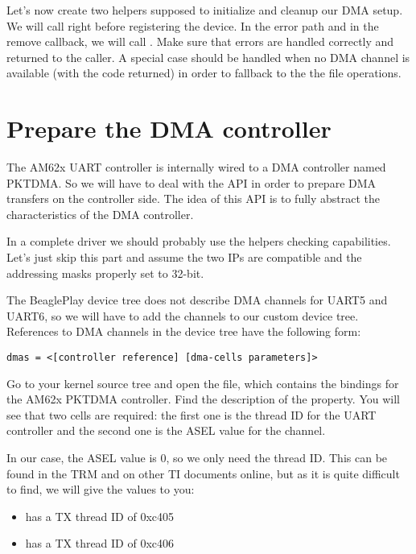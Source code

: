 Let's now create two helpers supposed to initialize and cleanup our DMA
setup. We will call  right before registering
the  device. In the  error path and in the
remove callback, we will call . Make sure that errors
are handled correctly and returned to the caller. A special case should be
handled when no DMA channel is available (with the  code returned)
in order to fallback to the the  file operations.

\section{Prepare the DMA controller}

The AM62x UART controller is internally wired to a DMA controller named PKTDMA.
So we will have to deal with the  API in order to prepare DMA
transfers on the controller side. The idea of this API is to fully abstract the
characteristics of the DMA controller.

In a complete driver we should probably use the helpers checking
capabilities. Let's just skip this part and assume the two IPs are
compatible and the addressing masks properly set to 32-bit.

The BeaglePlay device tree does not describe DMA channels for UART5 and UART6,
so we will have to add the channels to our custom device tree. References to DMA channels in the device tree have the following form:

\begin{verbatim}
dmas = <[controller reference] [dma-cells parameters]>
\end{verbatim}

Go to your kernel source tree and open the  file, which contains the bindings for the AM62x PKTDMA controller. Find the description of the  property. You will see that two cells are required: the first one is the thread ID for the UART controller and the second one is the ASEL value for the channel.

In our case, the ASEL value is 0, so we only need the thread ID. This can be found in the TRM and on other TI documents online, but as it is quite difficult to find, we will give the values to you:

\begin{itemize}
\item {} has a TX thread ID of 0xc405
\item {} has a TX thread ID of 0xc406
\end{itemize}

